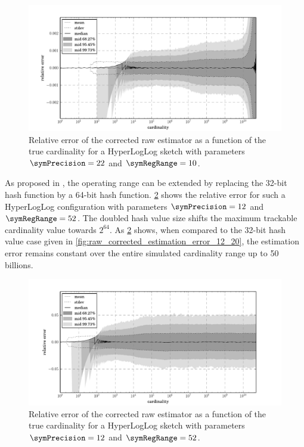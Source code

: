 \documentclass[a4paper]{scrartcl}
\begin{document}
\begin{figure}
\centering
\includegraphics[width=1\textwidth]{raw_corrected_estimate_22_10}
\caption{Relative error of the corrected raw estimator as a function of the true cardinality for a HyperLogLog sketch with parameters $\symPrecision = 22$ and $\symRegRange=10$.}
\label{fig:raw_corrected_estimation_error_22_10}
\end{figure}

As proposed in \cite{Heule2013}, the operating range can be extended by
replacing the 32-bit hash function by a 64-bit hash function. \cref{fig:raw_corrected_estimation_error_12_52} shows the relative error for such a HyperLogLog configuration with parameters $\symPrecision=12$ and $\symRegRange=52$. The doubled hash value size shifts the maximum trackable cardinality value towards $2^{64}$. As \cref{fig:raw_corrected_estimation_error_12_52} shows, when compared to the 32-bit hash value case given in \cref{fig:raw_corrected_estimation_error_12_20}, the estimation error remains constant over the entire simulated cardinality range up to 50 billions.

\begin{figure}
\centering
\includegraphics[width=1\textwidth]{raw_corrected_estimate_12_52}
\caption{Relative error of the corrected raw estimator as a function of the true cardinality for a HyperLogLog sketch with parameters $\symPrecision = 12$ and $\symRegRange=52$.}
\label{fig:raw_corrected_estimation_error_12_52}
\end{figure}
\end{document}
